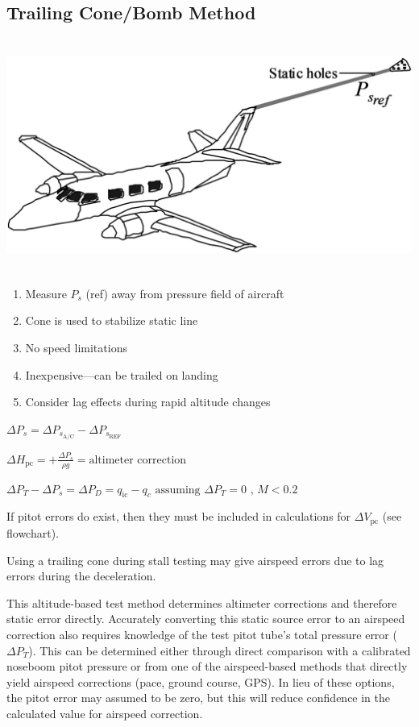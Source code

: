 \documentclass[
]{book}
\providecommand{\tightlist}{%
  \setlength{\itemsep}{0pt}\setlength{\parskip}{0pt}}
\begin{document}
\hypertarget{trailing-conebomb-method}{%
\subsection{Trailing Cone/Bomb Method}\label{trailing-conebomb-method}}

\includegraphics[width=5.9375in,height=3in]{media/04/image23.svg}

\begin{enumerate}
\def\labelenumi{\arabic{enumi}.}
\tightlist
\item
  Measure \(P_s\) (ref) away from pressure field of aircraft
\item
  Cone is used to stabilize static line
\item
  No speed limitations
\item
  Inexpensive---can be trailed on landing
\item
  Consider lag effects during rapid altitude changes
\end{enumerate}

\(\Delta P_s = \Delta P_{s_{\mathrm{A/C}}} - \Delta P_{s_{\mathrm{REF}}}\)

\(\Delta H_{\mathrm{pc}} = +\frac{\Delta P_s}{\rho g} = \textrm{altimeter correction}\)

\(\Delta P_T - \Delta P_s = \Delta P_D = q_{\mathrm{ic}} - q_c \text{ assuming } \Delta P_T = 0 \text{ , } M < 0.2\)

If pitot errors do exist, then they must be included in calculations for \(\Delta V_{\mathrm{pc}}\) (see flowchart).

Using a trailing cone during stall testing may give airspeed errors due to lag errors during the deceleration.

This altitude-based test method determines altimeter corrections and therefore static error directly. Accurately converting this static source error to an airspeed correction also requires knowledge of the test pitot tube's total pressure error (\(\Delta P_T\)). This can be determined either through direct comparison with a calibrated noseboom pitot pressure or from one of the airspeed-based methods that directly yield airspeed corrections (pace, ground course, GPS). In lieu of these options, the pitot error may assumed to be zero, but this will reduce confidence in the calculated value for airspeed correction.
\end{document}
